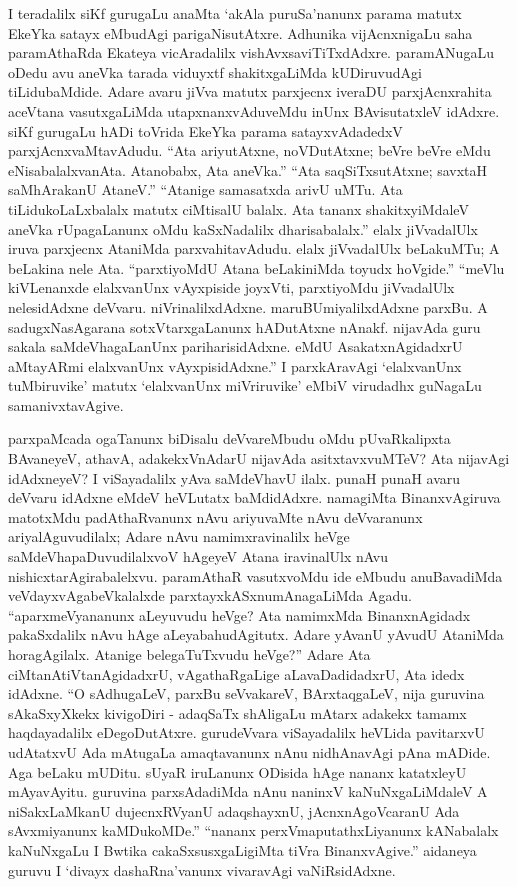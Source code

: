 I teradalilx siKf gurugaLu anaMta `akAla puruSa'nanunx parama matutx EkeYka satayx eMbudAgi parigaNisutAtxre. Adhunika vijAcnxnigaLu saha paramAthaRda Ekateya vicAradalilx vishAvxsaviTiTxdAdxre. paramANugaLu oDedu avu aneVka tarada viduyxtf shakitxgaLiMda kUDiruvudAgi tiLidubaMdide. Adare avaru jiVva matutx parxjecnx iveraDU parxjAcnxrahita aceVtana vasutxgaLiMda utapxnanxvAduveMdu inUnx BAvisutatxleV idAdxre. siKf gurugaLu hADi toVrida EkeYka parama satayxvAdadedxV parxjAcnxvaMtavAdudu. ``Ata ariyutAtxne, noVDutAtxne; beVre beVre eMdu eNisabalalxvanAta. Atanobabx, Ata aneVka.'' ``Ata saqSiTxsutAtxne; savxtaH saMhArakanU AtaneV.'' ``Atanige samasatxda arivU uMTu. Ata tiLidukoLaLxbalalx matutx ciMtisalU balalx. Ata tananx shakitxyiMdaleV aneVka rUpagaLanunx oMdu kaSxNadalilx dharisabalalx.'' elalx jiVvadalUlx iruva parxjecnx AtaniMda parxvahitavAdudu. elalx jiVvadalUlx beLakuMTu; A beLakina nele Ata. ``parxtiyoMdU Atana beLakiniMda toyudx hoVgide.'' ``meVlu kiVLenanxde elalxvanUnx vAyxpiside joyxVti, parxtiyoMdu jiVvadalUlx nelesidAdxne deVvaru. niVrinalilxdAdxne. maruBUmiyalilxdAdxne parxBu. A sadugxNasAgarana sotxVtarxgaLanunx hADutAtxne nAnakf. nijavAda guru sakala saMdeVhagaLanUnx pariharisidAdxne. eMdU AsakatxnAgidadxrU aMtayARmi elalxvanUnx vAyxpisidAdxne.'' I parxkAravAgi `elalxvanUnx tuMbiruvike' matutx `elalxvanUnx miVriruvike' eMbiV virudadhx guNagaLu samanivxtavAgive.

parxpaMcada ogaTanunx biDisalu deVvareMbudu oMdu pUvaRkalipxta BAvaneyeV, athavA, adakekxVnAdarU nijavAda asitxtavxvuMTeV? Ata nijavAgi idAdxneyeV? I viSayadalilx yAva saMdeVhavU ilalx. punaH punaH avaru deVvaru idAdxne eMdeV heVLutatx baMdidAdxre. namagiMta BinanxvAgiruva matotxMdu padAthaRvanunx nAvu ariyuvaMte nAvu deVvaranunx ariyalAguvudilalx; Adare nAvu namimxravinalilx heVge saMdeVhapaDuvudilalxvoV hAgeyeV Atana iravinalUlx nAvu nishicxtarAgirabalelxvu. paramAthaR vasutxvoMdu ide eMbudu anuBavadiMda veVdayxvAgabeVkalalxde parxtayxkASxnumAnagaLiMda Agadu. ``aparxmeVyananunx aLeyuvudu heVge? Ata namimxMda BinanxnAgidadx pakaSxdalilx nAvu hAge aLeyabahudAgitutx. Adare yAvanU yAvudU AtaniMda horagAgilalx. Atanige belegaTuTxvudu heVge?'' Adare Ata ciMtanAtiVtanAgidadxrU, vAgathaRgaLige aLavaDadidadxrU, Ata idedx idAdxne. ``O sAdhugaLeV, parxBu seVvakareV, BArxtaqgaLeV, nija guruvina sAkaSxyXkekx kivigoDiri - adaqSaTx shAligaLu mAtarx adakekx tamamx haqdayadalilx eDegoDutAtxre. gurudeVvara viSayadalilx heVLida pavitarxvU udAtatxvU Ada mAtugaLa amaqtavanunx nAnu nidhAnavAgi pAna mADide. Aga beLaku mUDitu. sUyaR iruLanunx ODisida hAge nananx katatxleyU mAyavAyitu. guruvina parxsAdadiMda nAnu naninxV kaNuNxgaLiMdaleV A niSakxLaMkanU dujecnxRVyanU adaqshayxnU, jAcnxnAgoVcaranU Ada sAvxmiyanunx kaMDukoMDe.'' ``nananx perxVmaputathxLiyanunx kANabalalx kaNuNxgaLu I Bwtika cakaSxsusxgaLigiMta tiVra BinanxvAgive.'' aidaneya guruvu I `divayx dashaRna'vanunx vivaravAgi vaNiRsidAdxne.

